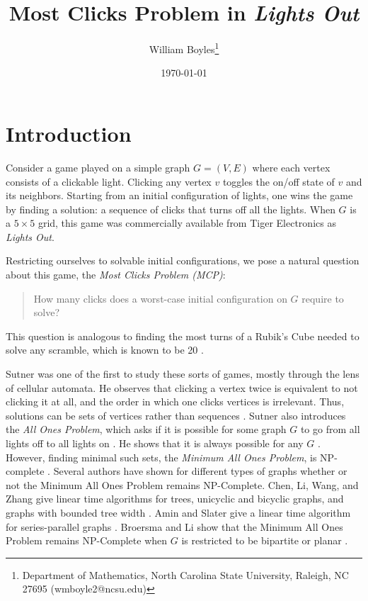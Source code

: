 \documentclass[a4paper]{article}
\begin{document}
	\title{Most Clicks Problem in \textit{Lights Out}}
	\author{William Boyles\thanks{Department of Mathematics, North Carolina State University, Raleigh, NC 27695 (wmboyle2@ncsu.edu)}}
	\date{\today}
	\maketitle
	
	\section{Introduction}
	Consider a game played on a simple graph $G=(V,E)$ where each vertex consists of a clickable light.
	Clicking any vertex $v$ toggles the on/off state of $v$ and its neighbors.
	Starting from an initial configuration of lights, one wins the game by finding a solution: a sequence of clicks that turns off all the lights.
	When $G$ is a $5 \times 5$ grid, this game was commercially available from Tiger Electronics as \textit{Lights Out}.
	
	Restricting ourselves to solvable initial configurations, we pose a natural question about this game, the \textit{Most Clicks Problem (MCP)}:
	\begin{quote}
		How many clicks does a worst-case initial configuration on $G$ require to solve?
	\end{quote}
	This question is analogous to finding the most turns of a Rubik's Cube needed to solve any scramble, which is known to be 20 \cite{Rockiki2013}.
	
	
	Sutner was one of the first to study these sorts of games, mostly through the lens of cellular automata.
	He observes that clicking a vertex twice is equivalent to not clicking it at all, and the order in which one clicks vertices is irrelevant.
	Thus, solutions can be sets of vertices rather than sequences \cite{Sutner1989}.
	Sutner also introduces the \textit{All Ones Problem}, which asks if it is possible for some graph $G$ to go from all lights off to all lights on \cite{Sutner1988}.
	He shows that it is always possible for any $G$ \cite{Sutner1989}.
	However, finding minimal such sets, the \textit{Minimum All Ones Problem}, is NP-complete \cite{Sutner1988}.
	Several authors have shown for different types of graphs whether or not the Minimum All Ones Problem remains NP-Complete.
	Chen, Li, Wang, and Zhang give linear time algorithms for trees, unicyclic and bicyclic graphs, and graphs with bounded tree width \cite{CHEN200493}.
	Amin and Slater give a linear time algorithm for series-parallel graphs \cite{AminSlater1992}.
	Broersma and Li show that the Minimum All Ones Problem remains NP-Complete when $G$ is restricted to be bipartite or planar \cite{BROERSMA200760}.
	
\end{document}
